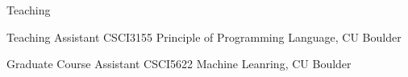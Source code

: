 \documentclass{resume} %
\begin{document}
\begin{rSection}{Teaching}

\begin{rSubsection}{}{}{}{}
\item \normalfont Teaching Assistant CSCI3155 Principle of Programming Language, CU Boulder
\item \normalfont Graduate Course Assistant CSCI5622 Machine Leanring, CU Boulder
\end{rSubsection}

\end{rSection}








\end{document}
